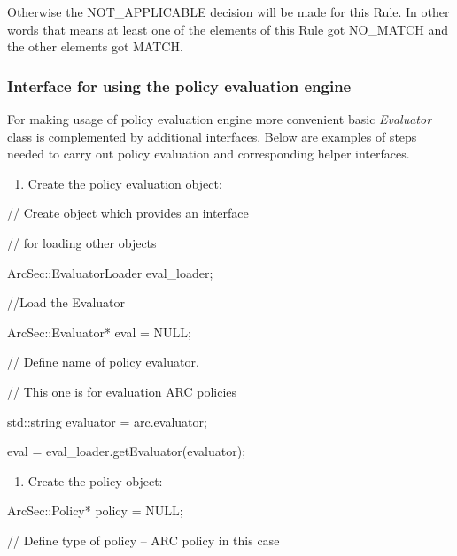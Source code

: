\documentclass{article}
\newcommand\liststyleWWviiiNumiii{%
\renewcommand\theenumi{\alph{enumi}}
\renewcommand\theenumii{\arabic{enumii}}
\renewcommand\theenumiii{\arabic{enumiii}}
\renewcommand\theenumiv{\arabic{enumiv}}
\renewcommand\labelenumi{\theenumi)}
\renewcommand\labelenumii{\theenumii.}
\renewcommand\labelenumiii{\theenumiii.}
\renewcommand\labelenumiv{\theenumiv.}
}
\newcommand\liststyleWWviiiNumiv{%
\renewcommand\theenumi{\alph{enumi}}
\renewcommand\theenumii{\arabic{enumii}}
\renewcommand\theenumiii{\arabic{enumiii}}
\renewcommand\theenumiv{\arabic{enumiv}}
\renewcommand\labelenumi{\theenumi)}
\renewcommand\labelenumii{\theenumii.}
\renewcommand\labelenumiii{\theenumiii.}
\renewcommand\labelenumiv{\theenumiv.}
}
\begin{document}
{\color{black}
Otherwise the NOT\_APPLICABLE decision will be made for this Rule. In
other words that means at least one of the elements of this Rule got
NO\_MATCH and the other elements got MATCH.}

\subsubsection{Interface for using the policy evaluation engine}
{\upshape\color{black}
For making usage of policy evaluation engine more convenient basic
\textit{Evaluator} class is complemented by additional interfaces.
Below are examples of steps needed to carry out policy evaluation and
corresponding helper interfaces.}

\liststyleWWviiiNumiii
\begin{enumerate}
\item {\color{black}
Create the policy evaluation object:}
\end{enumerate}
{\ttfamily\color{black}
// Create object which provides an interface }

{\ttfamily\color{black}
// for loading other objects}

{\ttfamily\color{black}
ArcSec::EvaluatorLoader eval\_loader; }

{\ttfamily\color{black}
//Load the Evaluator }

{\ttfamily\color{black}
ArcSec::Evaluator* eval = NULL;}

{\ttfamily\color{black}
// Define name of policy evaluator.}

{\ttfamily\color{black}
// This one is for evaluation ARC policies}

{\ttfamily\color{black}
std::string evaluator = {\textquotedbl}arc.evaluator{\textquotedbl}; }

{\ttfamily\color{black}
eval = eval\_loader.getEvaluator(evaluator);}

\liststyleWWviiiNumiv
\begin{enumerate}
\item {\color{black}
Create the policy object:}
\end{enumerate}
{\ttfamily\color{black}
ArcSec::Policy* policy = NULL; }

{\ttfamily\color{black}
// Define type of policy -- ARC policy in this case}
\end{document}
